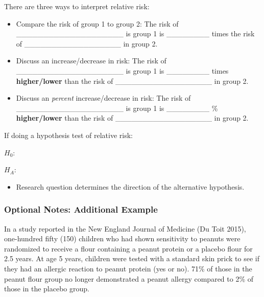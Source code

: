 \documentclass[
]{report}
\providecommand{\tightlist}{%
  \setlength{\itemsep}{0pt}\setlength{\parskip}{0pt}}
\begin{document}
There are three ways to interpret relative risk:

\begin{itemize}
\item
  Compare the risk of group 1 to group 2: The risk of \_\_\_\_\_\_\_\_\_\_\_\_\_\_\_\_\_\_\_\_ is group 1 is \_\_\_\_\_\_\_\_ times the risk of \_\_\_\_\_\_\_\_\_\_\_\_\_\_\_\_\_\_ in group 2.
\item
  Discuss an increase/decrease in risk: The risk of \_\_\_\_\_\_\_\_\_\_\_\_\_\_\_\_\_\_\_\_ is group 1 is \_\_\_\_\_\_\_\_ times \textbf{higher/lower} than the risk of \_\_\_\_\_\_\_\_\_\_\_\_\_\_\_\_\_\_ in group 2.
\item
  Discuss an \emph{percent} increase/decrease in risk: The risk of \_\_\_\_\_\_\_\_\_\_\_\_\_\_\_\_\_\_\_\_ is group 1 is \_\_\_\_\_\_\_\_ \% \textbf{higher/lower} than the risk of \_\_\_\_\_\_\_\_\_\_\_\_\_\_\_\_\_\_ in group 2.
\end{itemize}

\vspace{0.2in}


If doing a hypothesis test of relative risk:

\(H_0:\)

\vspace{0.2in}

\(H_A:\)

\vspace{0.2in}

\begin{itemize}
\tightlist
\item
  Research question determines the direction of the alternative hypothesis.
\end{itemize}

\subsubsection*{Optional Notes: Additional Example}\label{optional-notes-additional-example-12}

In a study reported in the New England Journal of Medicine ({Du Toit} 2015), one-hundred fifty (150) children who had shown sensitivity to peanuts were randomized to receive a flour containing a peanut protein or a placebo flour for 2.5 years. At age 5 years, children were tested with a standard skin prick to see if they had an allergic reaction to peanut protein (yes or no). 71\% of those in the peanut flour group no longer demonstrated a peanut allergy compared to 2\% of those in the placebo group.
\end{document}
